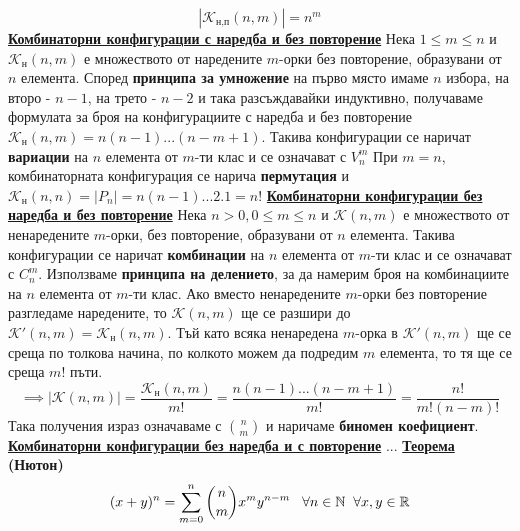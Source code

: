 \documentclass{article}
\begin{document}
$$|\mathcal{K}_{\text{н,п}}(n, m)| = n^m$$
\textbf{\underline{Комбинаторни конфигурации с наредба и без повторение}} \newline\newline
Нека $1 \le m \le n$ и $\mathcal{K}_{\text{н}}(n, m)$ е множеството от наредените $m$-орки без повторение, образувани от $n$
елемента. Според \textbf{принципа за умножение} на първо място имаме $n$ избора, на второ - $n - 1$,
на трето - $n - 2$ и така разсъждавайки индуктивно, получаваме формулата за броя на конфигурациите с наредба и без повторение
$\mathcal{K}_{\text{н}}(n, m) = n(n - 1)...(n - m + 1)$. Такива конфигурации се наричат \textbf{вариации} на $n$ елемента от $m$-ти клас и се означават с $V_n^m$\newline
При $m = n$, комбинаторната конфигурация се нарича \textbf{пермутация} и $\mathcal{K}_{\text{н}}(n, n) = |P_n| = n(n - 1)...2.1 = n!$ \newline\newline
\textbf{\underline{Комбинаторни конфигурации без наредба и без повторение}} \newline\newline
Нека $n > 0, 0 \le m \le n$ и $\mathcal{K}(n, m)$ е множеството от ненаредените $m$-орки, без повторение, образувани от $n$ елемента. Такива конфигурации се наричат \textbf{комбинации} на $n$ елемента от $m$-ти клас и се
означават с $C_n^m$. Използваме \textbf{принципа на делението}, за да намерим броя на комбинациите на $n$ елемента от $m$-ти клас.
Ако вместо ненаредените $m$-орки без повторение разгледаме наредените, то $\mathcal{K}(n, m)$ ще се разшири до
$\mathcal{K'}(n, m) = \mathcal{K_{\text{н}}}(n, m)$. Тъй като всяка ненаредена $m$-орка в $\mathcal{K'}(n, m)$ ще се среща по толкова
начина, по колкото можем да подредим $m$ елемента, то тя ще се среща $m!$ пъти. $$\implies |\mathcal{K}(n, m)| = \frac{\mathcal{K_{\text{н}}}
(n, m)}{m!} = \frac{n(n - 1) ... (n - m + 1)}{m!} = \frac{n!}{m!(n - m)!}$$ Така получения израз означаваме с $\binom{n}{m}$ и
наричаме \textbf{биномен коефициент}. \newline\newline
\textbf{\underline{Комбинаторни конфигурации без наредба и с повторение}} \newline
$...$ \newline\newline
\textbf{\underline{Теорема} (Нютон)}
$$(x + y)^n = \sum_{m = 0}^{n}\binom{n}{m}x^my^{n-m} \hspace{0.3cm} \forall n \in \mathbb{N} \hspace{0.2cm} \forall x, y \in \mathbb{R}$$
\end{document}

